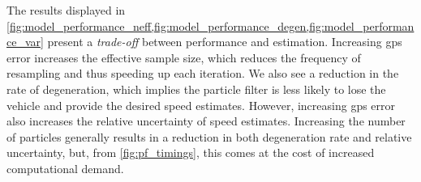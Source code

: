 The results displayed in \cref{fig:model_performance_neff,fig:model_performance_degen,fig:model_performance_var} present a \emph{trade-off} between performance and estimation. Increasing \gls{gps} error increases the effective sample size, which reduces the frequency of resampling and thus speeding up each iteration. We also see a reduction in the rate of degeneration, which implies the particle filter is less likely to lose the vehicle and provide the desired speed estimates. However, increasing \gls{gps} error also increases the relative uncertainty of speed estimates. Increasing the number of particles generally results in a reduction in both degeneration rate and relative uncertainty, but, from \cref{fig:pf_timings}, this comes at the cost of increased computational demand.
